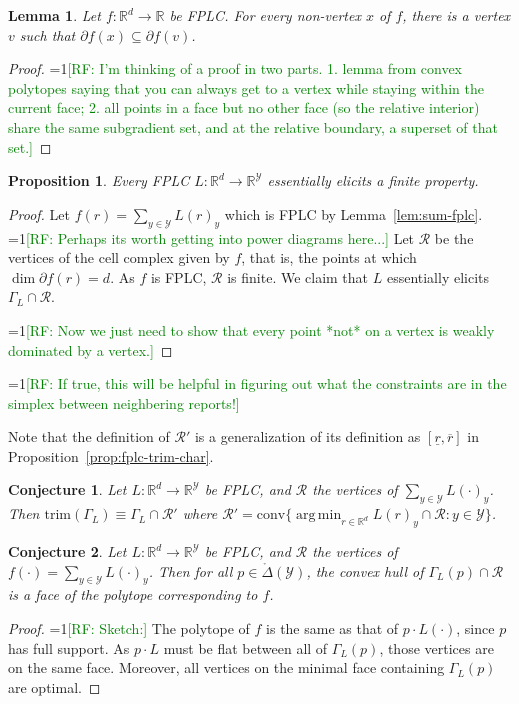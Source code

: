 \documentclass[11pt]{article}
\newcommand{\Comments}{1}
\newcommand{\mynote}[2]{\ifnum\Comments=1\textcolor{#1}{#2}\fi}
\newcommand{\raf}[1]{\mynote{green}{[RF: #1]}}
\newcommand{\reals}{\mathbb{R}}
\newcommand{\R}{\mathcal{R}}
\newcommand{\Y}{\mathcal{Y}}
\newcommand{\inter}[1]{\mathring{#1}}%
\newcommand{\trim}{\mathrm{trim}}
\newcommand{\conv}{\mathrm{conv}}
\DeclareMathOperator*{\argmin}{arg\,min}
\newtheorem{lemma}{Lemma}
\newtheorem{proposition}{Proposition}
\newtheorem{conjecture}{Conjecture}
\begin{document}
\begin{lemma}\label{lem:vertiex-subgrad}
  Let $f:\reals^d\to\reals$ be FPLC.
  For every non-vertex $x$ of $f$, there is a vertex $v$ such that $\partial f(x) \subseteq \partial f(v)$.
\end{lemma}
\begin{proof}
  \raf{I'm thinking of a proof in two parts.  1. lemma from convex polytopes saying that you can always get to a vertex while staying within the current face; 2. all points in a face but no other face (so the relative interior) share the same subgradient set, and at the relative boundary, a superset of that set.}
\end{proof}

\begin{proposition}\label{cor:fplc-finite}
  Every FPLC $L : \reals^d \to \reals^\Y$ essentially elicits a finite property.
\end{proposition}
\begin{proof}
  Let $f(r) = \sum_{y\in\Y} L(r)_y$ which is FPLC by Lemma~\ref{lem:sum-fplc}.
  \raf{Perhaps its worth getting into power diagrams here...}
  Let $\R$ be the vertices of the cell complex given by $f$, that is, the points at which $\dim\partial f(r) = d$.
  As $f$ is FPLC, $\R$ is finite.
  We claim that $L$ essentially elicits $\Gamma_L\cap\R$.
  
  \raf{Now we just need to show that every point *not* on a vertex is weakly dominated by a vertex.}
\end{proof}

\raf{If true, this will be helpful in figuring out what the constraints are in the simplex between neighbering reports!}

Note that the definition of $\R'$ is a generalization of its definition as $[\underline r, \overline r]$ in Proposition~\ref{prop:fplc-trim-char}.
\begin{conjecture}
  Let $L:\reals^d \to\reals^\Y$ be FPLC, and $\R$ the vertices of $\sum_{y\in\Y} L(\cdot)_y$.
  Then $\trim(\Gamma_L) \equiv \Gamma_L\cap \R'$ where $\R' = \conv \{ \argmin_{r\in\reals^d} L(r)_y \cap \R : y\in\Y\}$.
\end{conjecture}

\begin{conjecture}
  Let $L:\reals^d \to\reals^\Y$ be FPLC, and $\R$ the vertices of $f(\cdot) = \sum_{y\in\Y} L(\cdot)_y$.
  Then for all $p\in\inter\Delta(\Y)$, the convex hull of $\Gamma_L(p)\cap\R$ is a face of the polytope corresponding to $f$.
\end{conjecture}
\begin{proof}
  \raf{Sketch:}
  The polytope of $f$ is the same as that of $p\cdot L(\cdot)$, since $p$ has full support.  As $p\cdot L$ must be flat between all of $\Gamma_L(p)$, those vertices are on the same face.  Moreover, all vertices on the minimal face containing $\Gamma_L(p)$ are optimal.
\end{proof}
\end{document}
